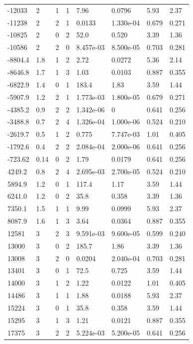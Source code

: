 \documentclass[preview]{standalone}
\begin{document}
{{\begin{tabular}{L{1.2cm}C{1.2cm} C{0.3cm}C{0.5cm} C{1.4cm}C{1.4cm} C{1.4cm}C{1.4cm}}
  -12033  &     2  & 1     &  1 &  7.96  & 0.0796  & 5.93 &  2.37   \\ 
  -11238  &     2  & 2     &  1 &  0.0133  & 1.330e-04  & 0.679 &  0.271   \\ 
  -10825  &     2  & 0     &  2 &  52.0  & 0.520  & 3.39 &  1.36   \\ 
  -10586  &     2  & 2     &  0 &  8.457e-03  & 8.500e-05  & 0.703 &  0.281   \\ 
  -8804.4  &   1.8  & 1     &  2 &  2.72  & 0.0272  & 5.36 &  2.14   \\ 
  -8646.8  &   1.7  & 1     &  3 &  1.03  & 0.0103  & 0.887 &  0.355   \\ 
  -6822.9  &   1.4  & 0     &  1 &  183.4  & 1.83  & 3.59 &  1.44   \\ 
  -5907.9  &   1.2  & 2     &  1 &  1.773e-03  & 1.800e-05  & 0.679 &  0.271   \\ 
  -4385.2  &   0.9  & 2     &  2 &  1.342e-06  & 0  & 0.641 &  0.256   \\ 
  -3488.8  &   0.7  & 2     &  4 &  1.326e-04  & 1.000e-06  & 0.524 &  0.210   \\ 
  -2619.7  &   0.5  & 1     &  2 &  0.775  & 7.747e-03  & 1.01 &  0.405   \\ 
  -1792.6  &   0.4  & 2     &  2 &  2.084e-04  & 2.000e-06  & 0.641 &  0.256   \\ 
  -723.62  &  0.14  & 0     &  2 &  1.79  & 0.0179  & 0.641 &  0.256   \\ 
  4249.2  &   0.8  & 2     &  4 &  2.695e-03  & 2.700e-05  & 0.524 &  0.210   \\ 
  5894.9  &   1.2  & 0     &  1 &  117.4  & 1.17  & 3.59 &  1.44   \\ 
  6241.0  &   1.2  & 0     &  2 &  35.8  & 0.358  & 3.39 &  1.36   \\ 
  7350.1  &   1.5  & 1     &  1 &  9.99  & 0.0999  & 5.93 &  2.37   \\ 
  8087.9  &   1.6  & 1     &  3 &  3.64  & 0.0364  & 0.887 &  0.355   \\ 
  12581  &     3  & 2     &  3 &  9.591e-03  & 9.600e-05  & 0.599 &  0.240   \\ 
  13000  &     3  & 0     &  2 &  185.7  & 1.86  & 3.39 &  1.36   \\ 
  13008  &     3  & 2     &  0 &  0.0204  & 2.040e-04  & 0.703 &  0.281   \\ 
  13401  &     3  & 0     &  1 &  72.5  & 0.725  & 3.59 &  1.44   \\ 
  14000  &     3  & 1     &  2 &  1.22  & 0.0122  & 1.01 &  0.405   \\ 
  14486  &     3  & 1     &  1 &  1.88  & 0.0188  & 5.93 &  2.37   \\ 
  15224  &     3  & 0     &  1 &  35.8  & 0.358  & 3.59 &  1.44   \\ 
  15295  &     3  & 1     &  3 &  1.21  & 0.0121  & 0.887 &  0.355   \\ 
  17375  &     3  & 2     &  2 &  5.224e-03  & 5.200e-05  & 0.641 &  0.256   \\ 
\hline 
\end{tabular} 

}}
\end{document}
